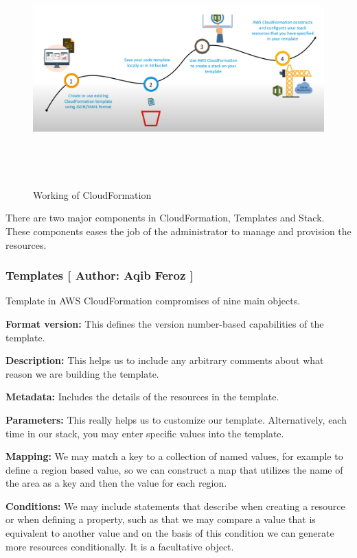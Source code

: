 \begin{figure}[h]
    \centering
    \includegraphics[scale=1.3, width=16cm, height=9cm]{images/Aqib Feroz/clfor.PNG}
    \caption{Working of CloudFormation}
    \label{fig:my_label}
\end{figure}

There are two major components in CloudFormation, Templates and Stack. These components eases the job of the administrator to manage and provision the resources. 
\subsubsection{Templates [ Author: Aqib Feroz ]}
Template in AWS CloudFormation compromises of nine main objects.

\textbf{Format version:} This defines the version number-based capabilities of the template.

\textbf{Description:} This helps us to include any arbitrary comments about what reason we are building the template.

\textbf{Metadata:} Includes the details of the resources in the template.

\textbf{Parameters:} This really helps us to customize our template. Alternatively, each time in our stack, you may enter specific values into the template.

\textbf{Mapping:} We may match a key to a collection of named values, for example to define a region based value, so we can construct a map that utilizes the name of the area as a key and then the value for each region.

\textbf{Conditions:} We may include statements that describe when creating a resource or when defining a property, such as that we may compare a value that is equivalent to another value and on the basis of this condition we can generate more resources conditionally. It is a facultative object.

